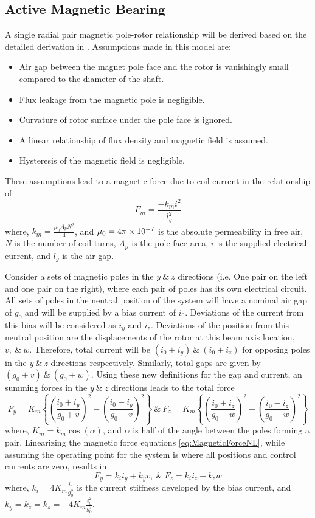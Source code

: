 \subsection{Active Magnetic Bearing}\label{Active Magnetic Bearing}
A single radial pair magnetic pole-rotor relationship will be derived based on the detailed derivation in \cite{das2008vibration}. Assumptions made in this model are:
\begin{itemize}
	\item Air gap between the magnet pole face and the rotor is vanishingly small compared to the diameter of the shaft.\
	\item Flux leakage from the magnetic pole is negligible.
	\item Curvature of rotor surface under the pole face is ignored.
	\item A linear relationship of flux density and magnetic field is assumed.
	\item Hysteresis of the magnetic field is negligible.
\end{itemize}
These assumptions lead to a magnetic force due to coil current in the relationship of
\begin{equation}\label{key}
F_m=\frac{-k_mi^2}{l_g^2}
\end{equation}
where, $ k_m=\frac{\mu_0A_pN^2}{4} $, and $ \mu_0=4\pi\times 10^{-7} $ is the absolute permeability in free air, $ N $ is the number of coil turns, $ A_p $ is the pole face area, $ i $ is the supplied electrical current, and $ l_g $ is the air gap.\par 
Consider a sets of magnetic poles in the $ y\ \&\ z $ directions (i.e. One pair on the left and one pair on the right), where each pair of poles has its own electrical circuit. All sets of poles in the neutral position of the system will have a nominal air gap of $ g_0 $ and will be supplied by a bias current of $ i_0 $. Deviations of the current from this bias will be considered as $ i_y $ and $ i_z $. Deviations of the position from this neutral position are the displacements of the rotor at this beam axis location, $ v,\ \&\ w $. Therefore, total current will be $ (i_0\pm i_y)\ \&\ (i_0\pm i_z) $ for opposing poles in the $ y\ \&\ z $ directions respectively. Similarly, total gaps are given by $ (g_0\pm v)\ \&\ (g_0\pm w) $. Using these new definitions for the gap and current, an summing forces in the $ y\ \&\ z $ directions leads to the total force
\begin{equation}\label{eq:MagneticForceNL}
F_y=K_m\left\{\left(\frac{i_0+i_y}{g_0+v}\right)^2-\left(\frac{i_0-i_y}{g_0-v}\right)^2\right\}\ \&\ F_z=K_m\left\{\left(\frac{i_0+i_z}{g_0+w}\right)^2-\left(\frac{i_0-i_z}{g_0-w}\right)^2\right\}
\end{equation}
where, $ K_m=k_m\cos(\alpha) $, and $ \alpha $ is half of the angle between the poles forming a pair. Linearizing the magnetic force equations \eqref{eq:MagneticForceNL}, while assuming the operating point for the system is where all positions and control currents are zero, results in
\begin{equation}\label{eq:MagneticForce}
F_y=k_ii_y+k_yv,\ \&\ F_z=k_ii_z+k_zw
\end{equation}
where, $ k_i=4K_m\frac{i_0}{g_0^2} $ is the current stiffness developed by the bias current, and $ k_y=k_z=k_s=-4K_m\frac{i_0^2}{g_0^3} $.
